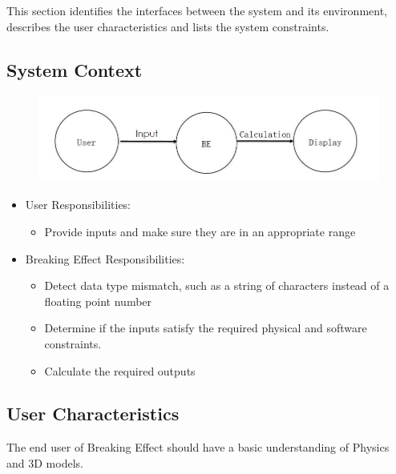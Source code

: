 \documentclass[12pt]{article}
\newcommand{\progname}{Breaking Effect} %
\begin{document}
This section identifies the interfaces between the system and its environment,
describes the user characteristics and lists the system constraints.

\subsection{System Context}

\begin{figure}
	\centering
	\includegraphics[width=0.7\linewidth]{./f18}
	\caption{}
	\label{fig:f18}
\end{figure}

\begin{itemize}
\item User Responsibilities:
\begin{itemize}
\item Provide inputs and make sure they are in an appropriate range 
\end{itemize}
\item \progname{} Responsibilities:
\begin{itemize}
\item Detect data type mismatch, such as a string of characters instead of a
  floating point number
\item Determine if the inputs satisfy the required physical and software
  constraints.​ 
\item Calculate the required outputs
\end{itemize}
\end{itemize}

\subsection{User Characteristics} \label{SecUserCharacteristics}

The end user of \progname{} should have a basic understanding of Physics and 3D
models. 
\end{document}
